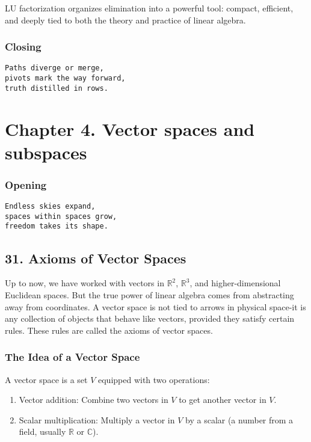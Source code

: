 \documentclass[
  letterpaper,
  DIV=11,
  numbers=noendperiod]{scrreprt}
\providecommand{\tightlist}{%
  \setlength{\itemsep}{0pt}\setlength{\parskip}{0pt}}
\begin{document}
LU factorization organizes elimination into a powerful tool: compact,
efficient, and deeply tied to both the theory and practice of linear
algebra.

\subsubsection{Closing}\label{closing-2}

\begin{verbatim}
Paths diverge or merge,
pivots mark the way forward,
truth distilled in rows.
\end{verbatim}

\section{Chapter 4. Vector spaces and
subspaces}\label{chapter-4.-vector-spaces-and-subspaces-1}

\subsubsection{Opening}\label{opening-2}

\begin{verbatim}
Endless skies expand,
spaces within spaces grow,
freedom takes its shape.
\end{verbatim}

\subsection{31. Axioms of Vector Spaces}\label{axioms-of-vector-spaces}

Up to now, we have worked with vectors in \(\mathbb{R}^2\),
\(\mathbb{R}^3\), and higher-dimensional Euclidean spaces. But the true
power of linear algebra comes from abstracting away from coordinates. A
vector space is not tied to arrows in physical space-it is any
collection of objects that behave like vectors, provided they satisfy
certain rules. These rules are called the axioms of vector spaces.

\subsubsection{The Idea of a Vector
Space}\label{the-idea-of-a-vector-space}

A vector space is a set \(V\) equipped with two operations:

\begin{enumerate}
\def\labelenumi{\arabic{enumi}.}
\tightlist
\item
  Vector addition: Combine two vectors in \(V\) to get another vector in
  \(V\).
\item
  Scalar multiplication: Multiply a vector in \(V\) by a scalar (a
  number from a field, usually \(\mathbb{R}\) or \(\mathbb{C}\)).
\end{enumerate}
\end{document}

